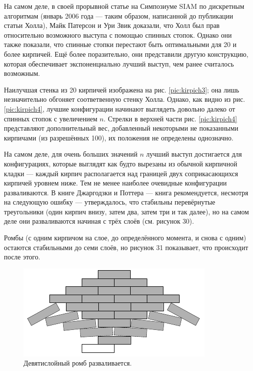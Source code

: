 На самом деле, в своей прорывной статье \cite{47} на Симпозиуме SIAM по дискретным алгоритмам (январь 2006 года --- таким образом, написанной до публикации статьи Холла), Майк Патерсон и Ури Звик доказали, что Холл был прав относительно возможного выступа с помощью спинных стопок.
Однако они также показали, что спинные стопки перестают быть оптимальными для 20 и более кирпичей.
Ещё более поразительно, они представили другую конструкцию, которая обеспечивает экспоненциально лучший выступ, чем ранее считалось возможным.

Наилучшая стенка из 20 кирпичей изображена на рис. \ref{pic:kirpich3};
она лишь незначительно обгоняет соответвенную стенку Холла.
Однако, как видно из рис. \ref{pic:kirpich4}, лучшие конфигурации начинают выглядеть довольно далеко от спинных стопок с увеличением $n$.
Стрелки в верхней части рис. \ref{pic:kirpich4} представляют дополнительный вес, добавленный некоторыми не показанными кирпичами (из разрешённых 100), их положения не определены однозначно.

На самом деле, для очень больших значений $n$ лучший выступ достигается для конфигурациях, которые выглядят как будто вырезаны из обычной кирпичной кладки --- каждый кирпич располагается над границей двух соприкасающихся кирпичей уровнем ниже.
Тем не менее наиболее очевидные конфигурации разваливаются.
В книге Джаргодзки и Поттера \cite{38} --- книга рекомендуется, несмотря на следующую ошибку --- утверждалось, что стабильны перевёрнутые треугольники (один кирпич внизу, затем два, затем три и так далее), но на самом деле они разваливаются начиная с трёх слоёв (см. рисунок 30).  

Ромбы (с одним кирпичом на слое, до определённого момента, и снова с одним) остаются стабильными до семи слоёв, но рисунок 31 показывает, что происходит после этого.

\begin{figure}[htb!]
\centering
\includegraphics[scale=1]{pics/kirpich6}
\caption{Девятислойный ромб разваливается.}
\label{pic:kirpich6}
\end{figure}

